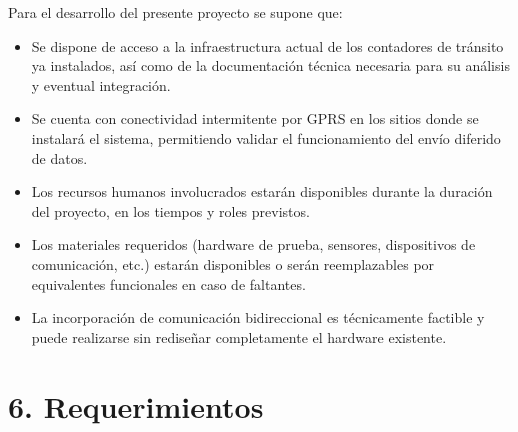 \documentclass[
11pt, %
]{charter}
\begin{document}
Para el desarrollo del presente proyecto se supone que:

\begin{itemize}
	\item Se dispone de acceso a la infraestructura actual de los contadores de tránsito ya instalados, así como de la documentación técnica necesaria para su análisis y eventual integración.
	\item Se cuenta con conectividad intermitente por GPRS en los sitios donde se instalará el sistema, permitiendo validar el funcionamiento del envío diferido de datos.
	\item Los recursos humanos involucrados  estarán disponibles durante la duración del proyecto, en los tiempos y roles previstos.
	\item Los materiales requeridos (hardware de prueba, sensores, dispositivos de comunicación, etc.) estarán disponibles o serán reemplazables por equivalentes funcionales en caso de faltantes.
	\item La incorporación de comunicación bidireccional es técnicamente factible y puede realizarse sin rediseñar completamente el hardware existente.
\end{itemize}

\section{6. Requerimientos}
\label{sec:requerimientos}
\end{document}
